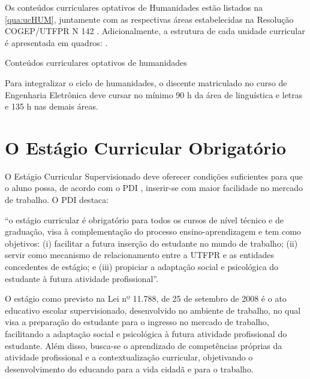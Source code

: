 Os conteúdos curriculares optativos de Humanidades estão listados na \autoref{qua:ucHUM}, juntamente com as respectivas áreas estabelecidas na Resolução COGEP/UTFPR N\textordmasculine{} 142 \cite{cogep142}. Adicionalmente, a estrutura de cada unidade curricular é apresentada em quadros: .

\begin{table}[!htb]
	\centering\footnotesize
	\caption{Conteúdos curriculares optativos de humanidades}
	\label{qua:ucHUM} %
\end{table}

Para integralizar o ciclo de humanidades, o discente matriculado no curso de Engenharia Eletrônica deve cursar no mínimo 90 h da área de linguística e letras e 135 h nas demais áreas.

\clearpage


\section{O Estágio Curricular Obrigatório}

O Estágio Curricular Supervisionado deve oferecer condições suficientes para que o aluno possa, de acordo com o PDI \cite{pdiutfpr}, inserir-se com maior facilidade no mercado de trabalho. O PDI destaca:

\begin{citacao}
	``o estágio curricular é obrigatório para todos os cursos de nível técnico e de graduação, visa à complementação do processo ensino-aprendizagem e tem como objetivos: (i) facilitar a futura inserção do estudante no mundo de trabalho; (ii) servir como mecanismo de relacionamento entre a UTFPR e as entidades concedentes de estágio; e (iii) propiciar a adaptação social e psicológica do estudante à futura atividade profissional''.
\end{citacao}


O estágio como previsto na Lei nº 11.788, de 25 de setembro de 2008 \cite{Lei:11788:2008} é o ato educativo escolar supervisionado, desenvolvido no ambiente de trabalho, no qual visa a preparação do estudante para o ingresso no mercado de trabalho, facilitando a adaptação social e psicológica à futura atividade profissional do estudante. Além disso, busca-se o aprendizado de competências próprias da atividade profissional e a contextualização curricular, objetivando o desenvolvimento do educando para a vida cidadã e para o trabalho.

